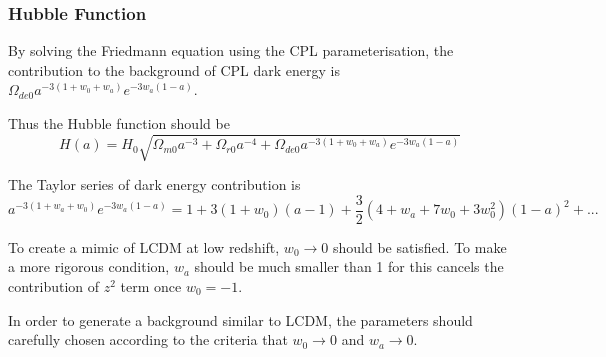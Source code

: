 \subsubsection{Hubble Function}

By solving the Friedmann equation using the CPL parameterisation, the contribution to the background of CPL dark energy is $\Omega_{de0}a^{-3(1+w_0+w_a)}e^{-3w_a(1-a)}$.

Thus the Hubble function should be
\begin{equation}
H(a)=H_0\sqrt{\Omega_{m0}a^{-3}+\Omega_{r0}a^{-4}+\Omega_{de0}a^{-3(1+w_0+w_a)}e^{-3w_a(1-a)}}
\end{equation}


The Taylor series of dark energy contribution is
\begin{equation}
a^{-3(1+w_a+w_0)}e^{-3w_a(1-a)}=1+3(1+w_0)(a-1)+\frac 3 2 (4+w_a+7w_0+3w_0^2)(1-a)^2+...\label{eq:CPL_HubbleEquation_Series}
\end{equation}

To create a mimic of LCDM at low redshift, $w_0\rightarrow 0$ should be satisfied. To make a more rigorous condition, $w_a$ should be much smaller than 1 for this cancels the contribution of $z^2$ term once $w_0=-1$.


In order to generate a background similar to LCDM, the parameters should carefully chosen according to the criteria that $w_0\rightarrow 0$ and $w_a\rightarrow 0$.

